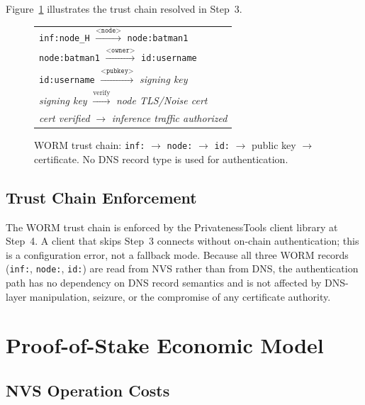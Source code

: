 \documentclass[11pt,a4paper]{article}
\theoremstyle{definition}
\begin{document}
Figure~\ref{fig:chain} illustrates the trust chain resolved in Step~3.

\begin{figure}[ht]
\begin{center}
\begin{tabular}{l}
\texttt{inf:node\_H} $\xrightarrow{\texttt{<node>}}$ \texttt{node:batman1}\\
\texttt{node:batman1} $\xrightarrow{\texttt{<owner>}}$ \texttt{id:username}\\
\texttt{id:username} $\xrightarrow{\texttt{<pubkey>}}$ \textit{signing key}\\
\textit{signing key} $\xrightarrow{\text{verify}}$ \textit{node TLS/Noise cert}\\
\textit{cert verified} $\rightarrow$ \textit{inference traffic authorized}\\
\end{tabular}
\end{center}
\caption{WORM trust chain: \texttt{inf:} $\to$ \texttt{node:} $\to$ \texttt{id:} $\to$ public key $\to$ certificate.  No DNS record type is used for authentication.}
\label{fig:chain}
\end{figure}

\subsection{Trust Chain Enforcement}

The WORM trust chain is enforced by the PrivatenessTools client library at
Step~4.  A client that skips Step~3 connects without on-chain authentication;
this is a configuration error, not a fallback mode.  Because all three
WORM records (\texttt{inf:}, \texttt{node:}, \texttt{id:}) are read from NVS
rather than from DNS, the authentication path has no dependency on DNS record
semantics and is not affected by DNS-layer manipulation, seizure, or the
compromise of any certificate authority.

\section{Proof-of-Stake Economic Model}
\label{sec:economics}

\subsection{NVS Operation Costs}
\end{document}
